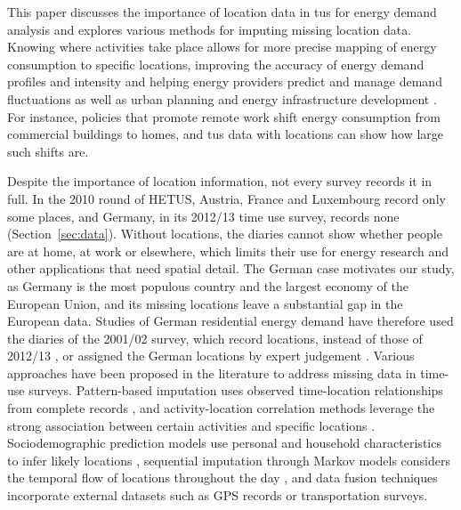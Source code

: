 \documentclass[a4paper]{article}
\begin{document}
This paper discusses the importance of location data in \ac{tus} for energy demand analysis and explores various methods for imputing missing location data. Knowing where activities take place allows for more precise mapping of energy consumption to specific locations, improving the accuracy of energy demand profiles \parencite{andersonElectricityConsumptionHousehold2015,mckennaHighresolutionStochasticIntegrated,widenCombinedMarkovchainBottomup2009} and intensity \parencite{torritiUnderstandingTimingEnergy2017} and helping energy providers predict and manage demand fluctuations as well as urban planning and energy infrastructure development \parencite{keirsteadReviewUrbanEnergy2012}. For instance, policies that promote remote work shift energy consumption from commercial buildings to homes, and \ac{tus} data with locations can show how large such shifts are.

Despite the importance of location information, not every survey records it in full. In the 2010 round of HETUS, Austria, France and Luxembourg record only some places, and Germany, in its 2012/13 time use survey, records none (Section~\ref{sec:data}). Without locations, the diaries cannot show whether people are at home, at work or elsewhere, which limits their use for energy research and other applications that need spatial detail. The German case motivates our study, as Germany is the most populous country and the largest economy of the European Union, and its missing locations leave a substantial gap in the European data. Studies of German residential energy demand have therefore used the diaries of the 2001/02 survey, which record locations, instead of those of 2012/13 \parencite{kleinebrahmUsingNeuralNetworks2021}, or assigned the German locations by expert judgement \parencite{mckennaExploringSocioeconomicTemporal2018}. Various approaches have been proposed in the literature to address missing data in time-use surveys. Pattern-based imputation uses observed time-location relationships from complete records \parencite{huebnerExplainingDomesticEnergy2015}, and activity-location correlation methods leverage the strong association between certain activities and specific locations \parencite{ellegard2011}. Sociodemographic prediction models use personal and household characteristics to infer likely locations \parencite{vanbuurenFlexibleImputationMissing2012, barthelemy2012}, sequential imputation through Markov models considers the temporal flow of locations throughout the day \parencite{kumarOptimalClassMemory2024}, and data fusion techniques incorporate external datasets such as GPS records or transportation surveys.
\end{document}
